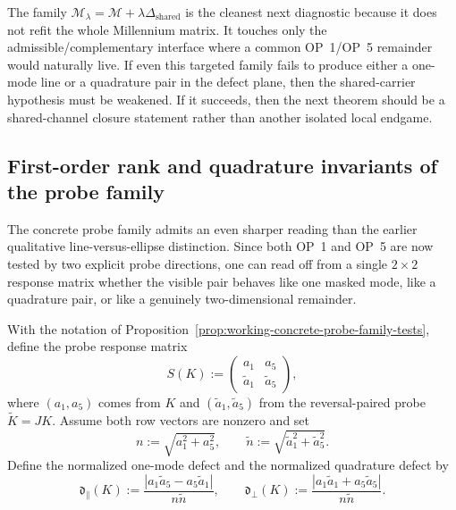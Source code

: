 \begin{remark}
\label{rem:working-why-probe-family-next}
The family \(\mathcal M_\lambda=\mathcal M+\lambda\Delta_{\mathrm{shared}}\) is the cleanest next diagnostic because it does not refit the whole Millennium matrix. It touches only the admissible/complementary interface where a common OP~1/OP~5 remainder would naturally live. If even this targeted family fails to produce either a one-mode line or a quadrature pair in the defect plane, then the shared-carrier hypothesis must be weakened. If it succeeds, then the next theorem should be a shared-channel closure statement rather than another isolated local endgame.
\end{remark}

\subsection*{First-order rank and quadrature invariants of the probe family}
The concrete probe family admits an even sharper reading than the earlier qualitative line-versus-ellipse distinction. Since both OP~1 and OP~5 are now tested by two explicit probe directions, one can read off from a single $2\times2$ response matrix whether the visible pair behaves like one masked mode, like a quadrature pair, or like a genuinely two-dimensional remainder.

\begin{definition}
\label{def:working-probe-response-matrix}
With the notation of Proposition~\ref{prop:working-concrete-probe-family-tests}, define the probe response matrix
\[
 S(K):=
 \begin{pmatrix}
 a_1 & a_5\\
 \tilde a_1 & \tilde a_5
 \end{pmatrix},
\]
where $(a_1,a_5)$ comes from $K$ and $(\tilde a_1,\tilde a_5)$ from the reversal-paired probe $\widetilde K=JK$.
Assume both row vectors are nonzero and set
\[
 n:=\sqrt{a_1^2+a_5^2},
 \qquad
 \tilde n:=\sqrt{\tilde a_1^2+\tilde a_5^2}.
\]
Define the normalized one-mode defect and the normalized quadrature defect by
\[
 \mathfrak d_{\parallel}(K)
 :=
 \frac{|a_1\tilde a_5-a_5\tilde a_1|}{n\tilde n},
 \qquad
 \mathfrak d_{\perp}(K)
 :=
 \frac{|a_1\tilde a_1+a_5\tilde a_5|}{n\tilde n}.
\]
\end{definition}

